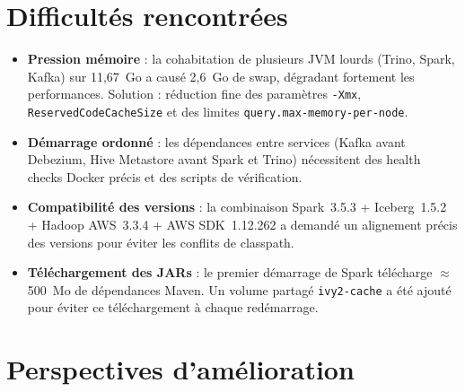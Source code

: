 \documentclass[12pt,a4paper]{report}
\begin{document}
\section{Difficultés rencontrées}

\begin{itemize}
    \item \textbf{Pression mémoire} : la cohabitation de plusieurs JVM lourds
          (Trino, Spark, Kafka) sur 11,67~Go a causé 2,6~Go de swap, dégradant
          fortement les performances. Solution : réduction fine des paramètres
          \texttt{-Xmx}, \texttt{ReservedCodeCacheSize} et des limites
          \texttt{query.max-memory-per-node}.

    \item \textbf{Démarrage ordonné} : les dépendances entre services (Kafka
          avant Debezium, Hive Metastore avant Spark et Trino) nécessitent des
          health checks Docker précis et des scripts de vérification.

    \item \textbf{Compatibilité des versions} : la combinaison Spark~3.5.3 +
          Iceberg~1.5.2 + Hadoop AWS~3.3.4 + AWS SDK~1.12.262 a demandé un
          alignement précis des versions pour éviter les conflits de classpath.

    \item \textbf{Téléchargement des JARs} : le premier démarrage de Spark
          télécharge $\approx$500~Mo de dépendances Maven. Un volume partagé
          \texttt{ivy2-cache} a été ajouté pour éviter ce téléchargement à
          chaque redémarrage.
\end{itemize}

\section{Perspectives d'amélioration}
\end{document}
